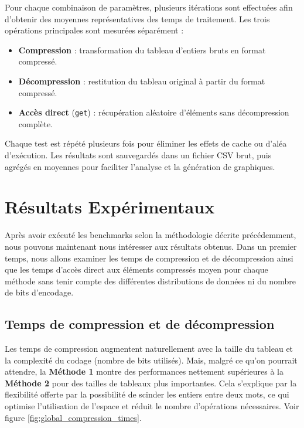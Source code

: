 \documentclass{rapportClass} %
\begin{document}
\vspace{1em}
Pour chaque combinaison de paramètres, plusieurs itérations sont effectuées afin d’obtenir des
moyennes représentatives des temps de traitement.  
Les trois opérations principales sont mesurées séparément :
\begin{itemize}
    \item \textbf{Compression} : transformation du tableau d’entiers bruts en format compressé.
    \item \textbf{Décompression} : restitution du tableau original à partir du format compressé.
    \item \textbf{Accès direct} (\texttt{get}) : récupération aléatoire d’éléments sans décompression complète.
\end{itemize}

\vspace{1em}
Chaque test est répété plusieurs fois pour éliminer les effets de cache ou d’aléa d’exécution.  
Les résultats sont sauvegardés dans un fichier CSV brut, puis agrégés en moyennes pour faciliter l’analyse
et la génération de graphiques.  

\section{Résultats Expérimentaux}

Après avoir exécuté les benchmarks selon la méthodologie décrite précédemment, nous pouvons maintenant nous intéresser aux résultats obtenus.
Dans un premier temps, nous allons examiner les temps de compression et de décompression ainsi que les temps d’accès direct aux éléments compressés
moyen pour chaque méthode sans tenir compte des différentes distributions de données ni du nombre de bits d'encodage.


\subsection{Temps de compression et de décompression}

Les temps de compression augmentent naturellement avec la taille du tableau et la complexité du codage
(nombre de bits utilisés).  
Mais, malgré ce qu'on pourrait attendre, la \textbf{Méthode 1} montre des performances nettement supérieures
à la \textbf{Méthode 2} pour des tailles de tableaux plus importantes.  
Cela s’explique par la flexibilité offerte par la possibilité de scinder les entiers entre deux mots,
ce qui optimise l’utilisation de l’espace et réduit le nombre d’opérations nécessaires.
Voir figure \ref{fig:global_compression_times}.
\end{document}
